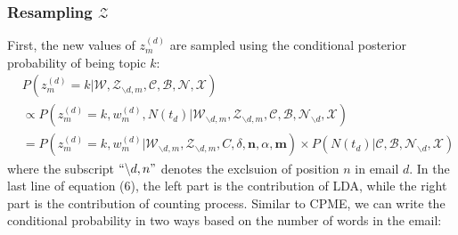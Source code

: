 \documentclass[a4paper]{article}
\begin{document}
\subsubsection{Resampling $\mathcal{Z}$}
First, the new values of $z^{(d)}_m$ are sampled using the conditional posterior probability of being topic $k$:
\begin{equation}
\begin{aligned} & P(z^{(d)}_m=k|\mathcal{W}, \mathcal{Z}_{\backslash d,m}, \mathcal{C}, \mathcal{B}, \mathcal{N}, \mathcal{X})\\ &\propto P(z^{(d)}_m=k, w^{(d)}_m, N{(t_d)}|\mathcal{W}_{\backslash d, m}, \mathcal{Z}_{\backslash d,m}, \mathcal{C}, \mathcal{B}, \mathcal{N}_{\backslash d}, \mathcal{X})\\
& = P(z^{(d)}_m=k, w^{(d)}_m|\mathcal{W}_{\backslash d, m}, \mathcal{Z}_{\backslash d,m}, C, \delta, \boldsymbol{n}, \alpha, \boldsymbol{m})\times P(N(t_d)|\mathcal{C}, \mathcal{B}, \mathcal{N}_{\backslash d}, \mathcal{X})
\end{aligned}
\end{equation}
where the subscript $``{\backslash d,n}"$ denotes the exclsuion of position $n$ in email $d$. In the last line of equation (6), the left part is the contribution of LDA, while the right part is the contribution of counting process. Similar to CPME, we can write the conditional probability in two ways based on the number of words in the email:
\end{document}
